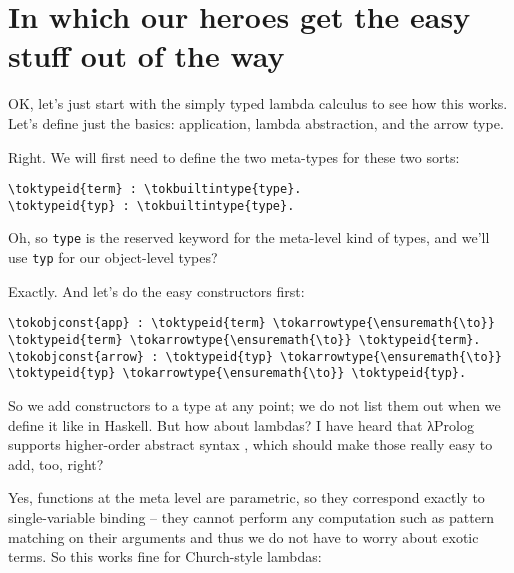 \section{In which our heroes get the easy stuff out of the
way}\label{in-which-our-heroes-get-the-easy-stuff-out-of-the-way}

\heroSTUDENT{} OK, let's just start with the simply typed lambda calculus to
see how this works. Let's define just the basics: application, lambda
abstraction, and the arrow type.

\heroADVISOR{} Right. We will first need to define the two meta-types for
these two sorts:

\importantCodeblock{}

\begin{verbatim}
\toktypeid{term} : \tokbuiltintype{type}.
\toktypeid{typ} : \tokbuiltintype{type}.
\end{verbatim}

\importantCodeblockEnd{}

\heroSTUDENT{} Oh, so \texttt{type} is the reserved keyword for the meta-level
kind of types, and we'll use \texttt{typ} for our object-level types?

\heroADVISOR{} Exactly. And let's do the easy constructors first:

\importantCodeblock{}

\begin{verbatim}
\tokobjconst{app} : \toktypeid{term} \tokarrowtype{\ensuremath{\to}} \toktypeid{term} \tokarrowtype{\ensuremath{\to}} \toktypeid{term}.
\tokobjconst{arrow} : \toktypeid{typ} \tokarrowtype{\ensuremath{\to}} \toktypeid{typ} \tokarrowtype{\ensuremath{\to}} \toktypeid{typ}.
\end{verbatim}

\importantCodeblockEnd{}

\heroSTUDENT{} So we add constructors to a type at any point; we do not list
them out when we define it like in Haskell. But how about lambdas? I
have heard that \foreignlanguage{greek}{λ}Prolog supports higher-order abstract syntax
\citep{hoas-standard-reference}, which should make those really easy to
add, too, right?

\heroADVISOR{} Yes, functions at the meta level are parametric, so they
correspond exactly to single-variable binding -- they cannot perform any
computation such as pattern matching on their arguments and thus we do
not have to worry about exotic terms. So this works fine for
Church-style lambdas:

\importantCodeblock{}

